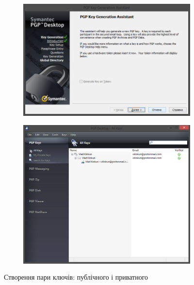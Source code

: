 \documentclass[
	a4paper,
	oneside,
	BCOR = 10mm,
	DIV = 12,
	12pt,
	headings = normal,
]{scrartcl}
\newlength{\gridunitwidth}
\begin{document}
		\begin{figure}[!htbp]
			\begin{subfigure}[b]{6 \gridunitwidth - 1em / (2-1)}
				\includegraphics[width = \columnwidth]{./assets/p01.png}
				\caption{}
				\label{subfig:pk-assistant-start}
			\end{subfigure}%
			\hspace{1em}%
			\begin{subfigure}[b]{6 \gridunitwidth - 1em / (2-1)}
				\includegraphics[width = \columnwidth]{./assets/p06.png}
				\caption{}
				\label{subfig:pk-assistant-res}
			\end{subfigure}
			\caption{Створення пари ключів: публічного і приватного}
			\label{fig:pk-generation}
		\end{figure}
\end{document}
